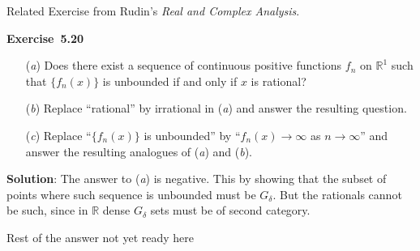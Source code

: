 \documentclass[12pt]{article}
\begin{document}
Related Exercise from Rudin's \emph{Real and Complex Analysis}.

\textbf{Exercise~5.20} \\
\begin{itemize}
\item[(\textit{a})]
Does there exist a sequence of continuous positive functions \(f_n\)
on \(\mathbb{R}^1\) such that \(\{f_n(x)\}\) is unbounded if and only
if $x$ is rational?

\item[(\textit{b})]
Replace ``rational'' by irrational in (\textit{a}) and answer the resulting
question.

\item[(\textit{c})]
Replace ``\(\{f_n(x)\}\) is unbounded''
by ``\(f_n(x)\to \infty\) as \(n\to\infty\)''
and answer the resulting analogues of (\textit{a}) and (\textit{b}).
\end{itemize}

\textbf{Solution}:
The answer to (\textit{a}) is negative.
This by showing that 
the subset of points where such sequence is unbounded must be \(G_\delta\).
But the rationals cannot be such, 
since in \(\mathbb{R}\) dense \(G_\delta\) sets must be of second category.

{\small Rest of the answer not yet ready here}
\end{document}
